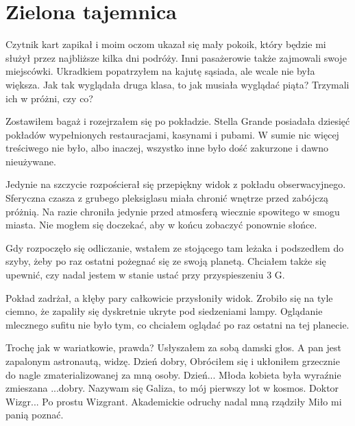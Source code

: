\chapter{Zielona tajemnica} 


Czytnik kart zapikał i moim oczom ukazał się mały pokoik, który będzie mi służył przez najbliższe kilka dni podróży.
Inni pasażerowie także zajmowali swoje miejscówki.
Ukradkiem popatrzyłem na kajutę sąsiada, ale wcale nie była większa.
Jak tak wyglądała druga klasa, to jak musiała wyglądać piąta? 
Trzymali ich w próżni, czy co?

Zostawiłem bagaż i rozejrzałem się po pokładzie.
Stella Grande posiadała dziesięć pokładów wypełnionych restauracjami, kasynami i pubami.
W sumie nic więcej treściwego nie było, albo inaczej, wszystko inne było dość zakurzone i dawno nieużywane.

Jedynie na szczycie rozpościerał się przepiękny widok z pokładu obserwacyjnego.
Sferyczna czasza z grubego pleksiglasu miała chronić wnętrze przed zabójczą próżnią.
Na razie chroniła jedynie przed atmosferą wiecznie spowitego w smogu miasta.
Nie mogłem się doczekać, aby w końcu zobaczyć ponownie słońce.

Gdy rozpoczęło się odliczanie, wstałem ze stojącego tam leżaka i podszedłem do szyby, żeby po raz ostatni pożegnać się ze swoją planetą.
Chciałem także się upewnić, czy nadal jestem w stanie ustać przy przyspieszeniu 3 G.

Pokład zadrżał, a kłęby pary całkowicie przysłoniły widok.
Zrobiło się na tyle ciemno, że zapaliły się dyskretnie ukryte pod siedzeniami lampy.
Oglądanie mlecznego sufitu nie było tym, co chciałem oglądać po raz ostatni na tej planecie.

\begin{dialogue}
	\ds{} Trochę jak w wariatkowie, prawda? \dm{} Usłyszałem za sobą damski głos. \dm{} A pan jest zapalonym astronautą, widzę.
	\ds{} Dzień dobry,  \dm{} Obróciłem się i ukłoniłem grzecznie do nagle zmaterializowanej za mną osoby.
	\ds{} Dzień... \dm{} Młoda kobieta była wyraźnie zmieszana \dm{} ...dobry. Nazywam się Galiza, to mój pierwszy lot w kosmos.
	\ds{} Doktor Wizgr... Po prostu Wizgrant. \dm{} Akademickie odruchy nadal mną rządziły \dm{} Miło mi panią poznać.
\end{dialogue}

